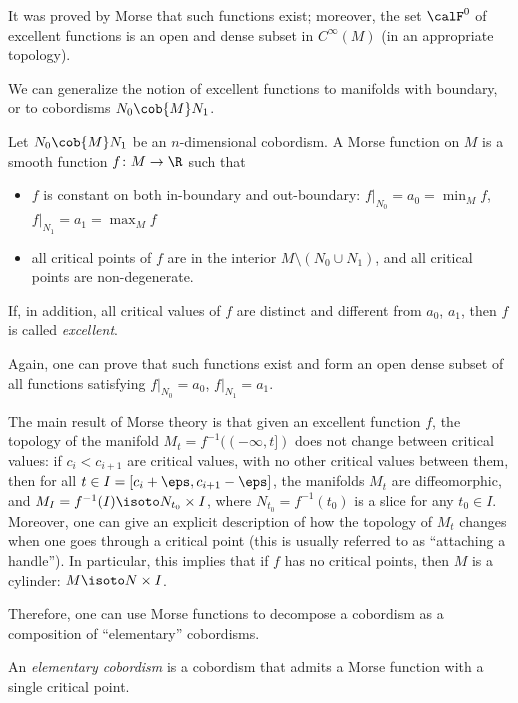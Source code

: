 It was proved by Morse that such functions exist; moreover, the set $\calF^0$
of excellent functions is an open and dense subset in $C^\infty(M)$
(in an appropriate topology).

We can generalize the notion of excellent functions to manifolds with boundary,
or to cobordisms $N_0\cob{M} N_1$.

\begin{definition}\label{d:morse-function3}
  Let $N_0\cob{M} N_1$ be an $n$-dimensional cobordism. A Morse function on $M$
  is a smooth function $f\colon M\to \R$ such that
  \begin{itemize}
    \item $f$ is constant on both in-boundary and out-boundary:
      $f|_{N_0}=a_0=\min_M f$, $f|_{N_1}=a_1=\max_M f$
    \item all critical points of $f$ are in the interior
      $M\setminus (N_0\cup N_1)$, and all critical points are non-degenerate.
  \end{itemize}
  If, in addition, all critical values of $f$ are distinct and different from
  $a_0$, $a_1$, then $f$ is called \emph{excellent}.
\end{definition}
 Again, one can prove
that such functions exist and form an open dense subset of all functions
satisfying $f|_{N_0}=a_0$, $f|_{N_1}=a_1$.

The main result of Morse theory is that given an excellent function $f$, the
topology of the manifold $M_t=f^{-1}((-\infty, t])$ does not change between
critical values: if $c_i<c_{i+1}$ are critical values, with no other critical
values between them, then for all $t\in I=[c_i+\eps, c_{i+1}-\eps]$, the
manifolds $M_t$ are diffeomorphic, and $M_I=f^{-1}(I)\isoto N_{t_0} \times I$,
where $N_{t_0}=f^{-1}(t_0)$ is a slice for any $t_0\in I$. Moreover, one can
give an explicit description of how the topology of $M_t$ changes when one goes
through a critical point (this is usually referred to as ``attaching a
handle''). In particular, this implies that if $f$ has no critical points, then
$M$ is a cylinder: $M\isoto N\times I$.

Therefore, one can use Morse functions to decompose a cobordism as a
composition of ``elementary'' cobordisms.
\begin{definition}\label{d:elem-cobordism}
  An \emph{elementary cobordism} is a cobordism that admits a Morse function
  with a single critical point.
\end{definition}

